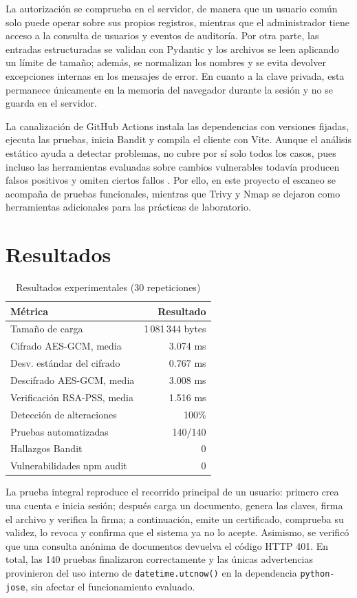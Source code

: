 \documentclass[conference]{IEEEtran}
\begin{document}
La autorización se comprueba en el servidor, de manera que un usuario común solo puede operar sobre sus propios registros, mientras que el administrador tiene acceso a la consulta de usuarios y eventos de auditoría. Por otra parte, las entradas estructuradas se validan con Pydantic y los archivos se leen aplicando un límite de tamaño; además, se normalizan los nombres y se evita devolver excepciones internas en los mensajes de error. En cuanto a la clave privada, esta permanece únicamente en la memoria del navegador durante la sesión y no se guarda en el servidor.

La canalización de GitHub Actions instala las dependencias con versiones fijadas, ejecuta las pruebas, inicia Bandit y compila el cliente con Vite. Aunque el análisis estático ayuda a detectar problemas, no cubre por sí solo todos los casos, pues incluso las herramientas evaluadas sobre cambios vulnerables todavía producen falsos positivos y omiten ciertos fallos \cite{lee2024}. Por ello, en este proyecto el escaneo se acompaña de pruebas funcionales, mientras que Trivy y Nmap se dejaron como herramientas adicionales para las prácticas de laboratorio.

\section{Resultados}
\begin{table}[ht]
\caption{Resultados experimentales (30 repeticiones)}
\label{tab:results}
\centering
\begin{tabular}{lr}
\toprule
\textbf{Métrica} & \textbf{Resultado}\\
\midrule
Tamaño de carga & 1\,081\,344 bytes\\
Cifrado AES-GCM, media & 3.074 ms\\
Desv. estándar del cifrado & 0.767 ms\\
Descifrado AES-GCM, media & 3.008 ms\\
Verificación RSA-PSS, media & 1.516 ms\\
Detección de alteraciones & 100\%\\
Pruebas automatizadas & 140/140\\
Hallazgos Bandit & 0\\
Vulnerabilidades npm audit & 0\\
\bottomrule
\end{tabular}
\end{table}

La prueba integral reproduce el recorrido principal de un usuario: primero crea una cuenta e inicia sesión; después carga un documento, genera las claves, firma el archivo y verifica la firma; a continuación, emite un certificado, comprueba su validez, lo revoca y confirma que el sistema ya no lo acepte. Asimismo, se verificó que una consulta anónima de documentos devuelva el código HTTP 401. En total, las 140 pruebas finalizaron correctamente y las únicas advertencias provinieron del uso interno de \texttt{datetime.utcnow()} en la dependencia \texttt{python-jose}, sin afectar el funcionamiento evaluado.
\end{document}
